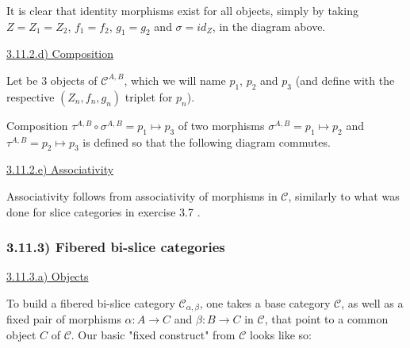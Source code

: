 \documentclass[12pt, letterpaper, twoside]{report}
\begin{document}
It is clear that identity morphisms exist for all objects, simply by taking $Z = Z_1 = Z_2$, $f_1 = f_2$, $g_1 = g_2$ and $\sigma = id_Z$, in the diagram above.

\vspace{5mm}
\underline{3.11.2.d) Composition}

Let be 3 objects of $\mathcal{C}^{A,B}$, which we will name $p_1$, $p_2$ and $p_3$ (and define with the respective $(Z_n, f_n, g_n)$ triplet for $p_n$).

Composition $\tau^{A, B} \circ \sigma^{A, B} = p_1 \mapsto p_3$ of two morphisms $\sigma^{A, B} = p_1 \mapsto p_2$ and $\tau^{A, B} = p_2 \mapsto p_3$ is defined so that the following diagram commutes.


\vspace{5mm}
\underline{3.11.2.e) Associativity}

Associativity follows from associativity of morphisms in $\mathcal{C}$, similarly to what was done for slice categories in exercise 3.7 .



\subsubsection*{3.11.3) Fibered bi-slice categories}

\vspace{5mm}
\underline{3.11.3.a) Objects}

To build a fibered bi-slice category $\mathcal{C}_{\alpha, \beta}$, one takes a base category $\mathcal{C}$, as well as a fixed pair of morphisms $\alpha : A \to C$ and $\beta : B \to C$ in $\mathcal{C}$, that point to a common object $C$ of $\mathcal{C}$. Our basic "fixed construct" from $\mathcal{C}$ looks like so: 
\end{document}

